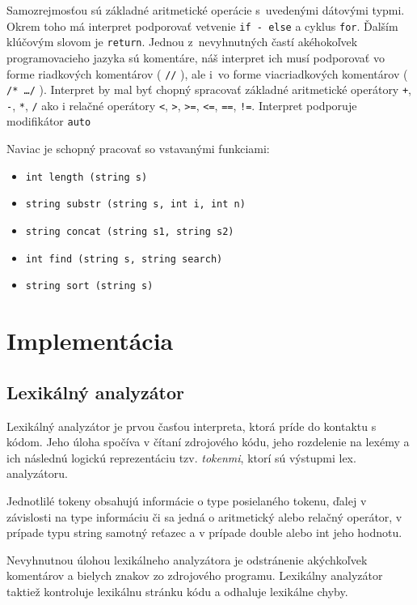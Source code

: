\documentclass[12pt,a4paper,titlepage,final]{article}
\begin{document}
Samozrejmosťou sú základné aritmetické operácie s uvedenými dátovými typmi. Okrem toho má interpret podporovať vetvenie \texttt{if - else} a cyklus \texttt{for}. Ďalším klúčovým slovom je \texttt{return}. Jednou z nevyhnutných častí akéhokoľvek programovacieho jazyka sú komentáre, náš interpret ich musí podporovať vo forme riadkových komentárov ( \texttt{//} ), ale i vo forme viacriadkových komentárov ( \texttt{/* \ldots */} ). 
Interpret by mal byť chopný spracovať základné aritmetické operátory \texttt{+}, \texttt{-}, \texttt{*}, \texttt{/} ako i relačné operátory \texttt{<}, \texttt{>}, \texttt{>=}, \texttt{<=}, \texttt{==}, \texttt{!=}.
Interpret podporuje modifikátor \texttt{auto}

Naviac  je schopný pracovať so vstavanými funkciami:

\begin{itemize}
\item \texttt{int length (string s)}
\item \texttt{string substr (string s, int i, int n)}
\item \texttt{string concat (string s1, string s2)}
\item \texttt{int find (string s, string search)}
\item \texttt{string sort (string s)}
\end{itemize}

\section{Implementácia} \label{implementace}

\subsection{Lexikálný analyzátor}
Lexikálný analyzátor je prvou časťou interpreta, ktorá príde do kontaktu s kódom. Jeho úloha spočíva
v čítaní zdrojového kódu, jeho rozdelenie na lexémy a ich následnú logickú reprezentáciu tzv.
\textit{tokenmi}, ktorí sú výstupmi lex. analyzátoru.

Jednotlilé tokeny obsahujú informácie o type posielaného tokenu, ďalej v závislosti na type
informáciu či sa jedná o aritmetický alebo relačný operátor, v prípade typu string samotný reťazec
a v prípade double alebo int jeho hodnotu.

Nevyhnutnou úlohou lexikálneho analyzátora je odstránenie akýchkoľvek komentárov a bielych
znakov zo zdrojového programu. Lexikálny analyzátor taktiež kontroluje lexikálnu stránku kódu
a odhaluje lexikálne chyby.
\end{document}
